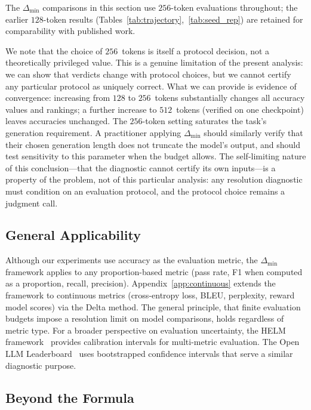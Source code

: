 \documentclass[pdflatex,sn-mathphys-ay,iicol]{sn-jnl}
\theoremstyle{thmstylethree}
\begin{document}
\begin{table}[t]
The $\Delta_{\min}$ comparisons in this section use $256$-token evaluations throughout; the earlier $128$-token results (Tables~\ref{tab:trajectory},~\ref{tab:seed_rep}) are retained for comparability with published work.

We note that the choice of $256$~tokens is itself a protocol decision, not a theoretically privileged value. This is a genuine limitation of the present analysis: we can show that verdicts change with protocol choices, but we cannot certify any particular protocol as uniquely correct. What we can provide is evidence of convergence: increasing from $128$ to $256$~tokens substantially changes all accuracy values and rankings; a further increase to $512$~tokens (verified on one checkpoint) leaves accuracies unchanged. The $256$-token setting saturates the task's generation requirement. A practitioner applying $\Delta_{\min}$ should similarly verify that their chosen generation length does not truncate the model's output, and should test sensitivity to this parameter when the budget allows. The self-limiting nature of this conclusion---that the diagnostic cannot certify its own inputs---is a property of the problem, not of this particular analysis: any resolution diagnostic must condition on an evaluation protocol, and the protocol choice remains a judgment call.

\subsection{General Applicability}

Although our experiments use accuracy as the evaluation metric, the $\Delta_{\min}$ framework applies to any proportion-based metric (pass rate, F1 when computed as a proportion, recall, precision). Appendix~\ref{app:continuous} extends the framework to continuous metrics (cross-entropy loss, BLEU, perplexity, reward model scores) via the Delta method. The general principle, that finite evaluation budgets impose a resolution limit on model comparisons, holds regardless of metric type. For a broader perspective on evaluation uncertainty, the HELM framework~\citep{liang2022helm} provides calibration intervals for multi-metric evaluation. The Open LLM Leaderboard~\citep{beeching2023openllm} uses bootstrapped confidence intervals that serve a similar diagnostic purpose.

\subsection{Beyond the Formula}


\end{table}
\end{document}
